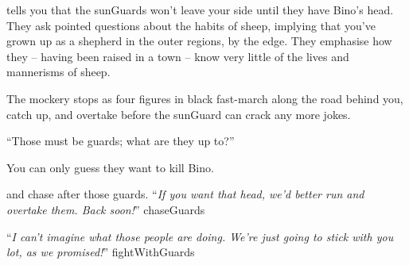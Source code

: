 tells you that the \glspl{sunGuard} won't leave your side until they have Bino's head.
They ask pointed questions about the habits of sheep, implying that you've grown up as a shepherd in the outer regions, by the \gls{edge}.
They emphasise how they -- having been raised in a town -- know very little of the lives and mannerisms of sheep.

The mockery stops as four figures in black fast-march along the road behind you, catch up, and overtake before the \gls{sunGuard} can crack any more jokes.

\begin{speechtext}
  ``Those must be \glspl{guard}; what are they up to?''
\end{speechtext}

You can only guess they want to kill Bino.

\begin{selectPath}
  {and chase after those \glspl{guard}.
  ``\textit{If you want that head, we'd better run and overtake them.
  Back soon!}''
  }%
  {chaseGuards}

  {``\textit{I can't imagine what those people are doing.
  We're just going to stick with you lot, as we promised!}''}%
  {fightWithGuards}
\end{selectPath}
